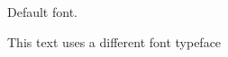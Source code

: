 \documentclass{article}
\begin{document}
Default font.
 
{\selectfont
This text uses a different font typeface
}
\end{document}
